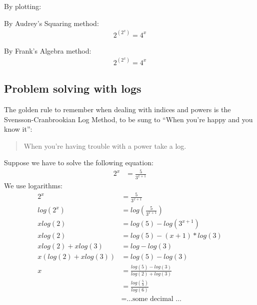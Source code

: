 By plotting:
\begin{figure}[!hbt]
\label{fig:SolvingLogEqnsEx0}
\end{figure}

By Audrey's Squaring method:
\begin{align}
  2^{(2^x)} = 4^x
\end{align}

By Frank's Algebra method:
\begin{align}
  2^{(2^x)} = 4^x
\end{align}

\subsection{Problem solving with logs}
The golden rule to remember when dealing with indices and powers is the
Svensson-Cranbrookian Log Method, to be sung to ``When you're happy and you know
it'':
\begin{quote}
  When you're having trouble with a power take a log.
\end{quote}

Suppose we have to solve the following equation:
\begin{align}
  2^{x} & = \frac{5}{3^{x+1}}
\end{align}
We use logarithms:
\begin{align}
  2^{x} & = \frac{5}{3^{x+1}} \\
  log(2^x) & = log(\frac{5}{3^{x+1}}) \\
  x log(2) & = log(5) - log(3^{x+1}) \\
  x log(2) & = log(5) - (x+1) * log(3) \\
  x log(2) + x log(3)  & = log - log(3) \\
  x(log(2) + x log(3)) & = log(5) - log(3) \\
  x & = \frac{log(5) - log(3)}{log(2) + log(3)} \\
    & = \frac{log(\frac{5}{3})}{log(6)} \\
    & = \text{\ldots some decimal \ldots }
\end{align}

